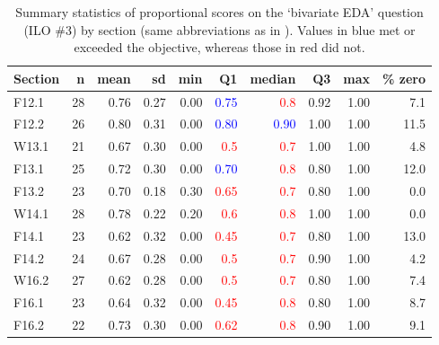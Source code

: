 \documentclass{article}\usepackage[]{graphicx}\usepackage[]{color}
\begin{document}
\begin{table}[h]
\centering
\caption{Summary statistics of proportional scores on the `bivariate EDA' question (ILO \#3) by section (same abbreviations as in ). Values in blue met or exceeded the objective, whereas those in red did not.} 
\label{tab:sumBEDAQ}
\begin{tabular}{lrrrrrrrrr}
  \hline
Section & n & mean & sd & min & \textbf{Q1} & \textbf{median} & Q3 & max & \% zero \\ 
  \hline
F12.1 & 28 & 0.76 & 0.27 & 0.00 & \textcolor{red}{\textcolor{blue}{0.75}} & \textcolor{red}{                    0.8} & 0.92 & 1.00 & 7.1 \\ 
  F12.2 & 26 & 0.80 & 0.31 & 0.00 & \textcolor{red}{\textcolor{blue}{0.80}} & \textcolor{red}{\textcolor{blue}{0.90}} & 1.00 & 1.00 & 11.5 \\ 
  W13.1 & 21 & 0.67 & 0.30 & 0.00 & \textcolor{red}{                    0.5} & \textcolor{red}{                    0.7} & 1.00 & 1.00 & 4.8 \\ 
  F13.1 & 25 & 0.72 & 0.30 & 0.00 & \textcolor{red}{\textcolor{blue}{0.70}} & \textcolor{red}{                    0.8} & 0.80 & 1.00 & 12.0 \\ 
  F13.2 & 23 & 0.70 & 0.18 & 0.30 & \textcolor{red}{                   0.65} & \textcolor{red}{                    0.7} & 0.80 & 1.00 & 0.0 \\ 
  W14.1 & 28 & 0.78 & 0.22 & 0.20 & \textcolor{red}{                    0.6} & \textcolor{red}{                    0.8} & 1.00 & 1.00 & 0.0 \\ 
  F14.1 & 23 & 0.62 & 0.32 & 0.00 & \textcolor{red}{                   0.45} & \textcolor{red}{                    0.7} & 0.80 & 1.00 & 13.0 \\ 
  F14.2 & 24 & 0.67 & 0.28 & 0.00 & \textcolor{red}{                    0.5} & \textcolor{red}{                    0.7} & 0.90 & 1.00 & 4.2 \\ 
  W16.2 & 27 & 0.62 & 0.28 & 0.00 & \textcolor{red}{                    0.5} & \textcolor{red}{                    0.7} & 0.80 & 1.00 & 7.4 \\ 
  F16.1 & 23 & 0.64 & 0.32 & 0.00 & \textcolor{red}{                   0.45} & \textcolor{red}{                    0.8} & 0.80 & 1.00 & 8.7 \\ 
  F16.2 & 22 & 0.73 & 0.30 & 0.00 & \textcolor{red}{                   0.62} & \textcolor{red}{                    0.8} & 0.90 & 1.00 & 9.1 \\ 

\end{tabular}
\end{table}
\end{document}
